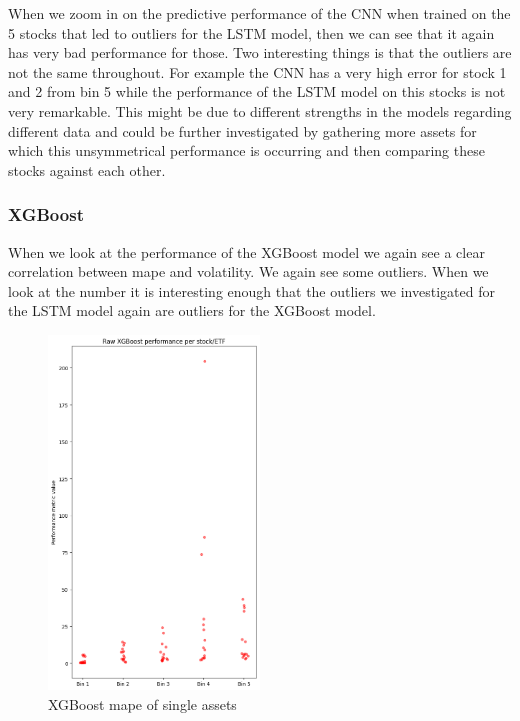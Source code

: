 \documentclass[a4paper,12pt]{report}
\begin{document}
	When we zoom in on the predictive performance of the CNN when trained on the 5 stocks that led to outliers for the LSTM model, then we can see that it again has very bad performance for those. Two interesting things is that the outliers are not the same throughout. For example the CNN has a very high error for stock 1 and 2 from bin 5 while the performance of the LSTM model on this stocks is not very remarkable. This might be due to different strengths in the models regarding different data and could be further investigated by gathering more assets for which this unsymmetrical performance is occurring and then comparing these stocks against each other. 
	

		\subsubsection*{XGBoost}



When we look at the performance of the XGBoost model we again see a clear correlation between mape and volatility. We again see some outliers. When we look at the number it is interesting enough that the outliers we investigated for the LSTM model again are outliers for the XGBoost model. 

\begin{figure}
  \includegraphics[width=0.5\textwidth]{images/results_XGBoost.png}
  \caption{XGBoost mape of single assets}
  \label{fig:wrapped}
\end{figure}
\end{document}
